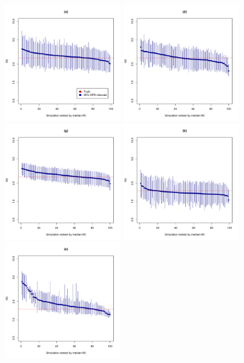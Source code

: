 \documentclass[12pt,titlepage]{article}
\begin{document}
\begin{figure}[ht]
    \centering
{%
    	\includegraphics[width=1.99in]{R0_MASTER_stochSIR_FINAL.pdf}
}
\quad
{%
    	\includegraphics[width=1.99in]{R0_MASTER_deterSIR_FINAL.pdf}
}
\quad
{%
    	\includegraphics[width=1.99in]{R0_MASTER_BDSIR_FINAL.pdf}
}
\quad
{%
    	\includegraphics[width=1.99in]{R0_lowerS0_stochSIR_FINAL.pdf}
}
\quad
{%
    	\includegraphics[width=1.99in]{R0_lowerS0_deterSIR_FINAL.pdf}
}
\end{figure}
\end{document}
